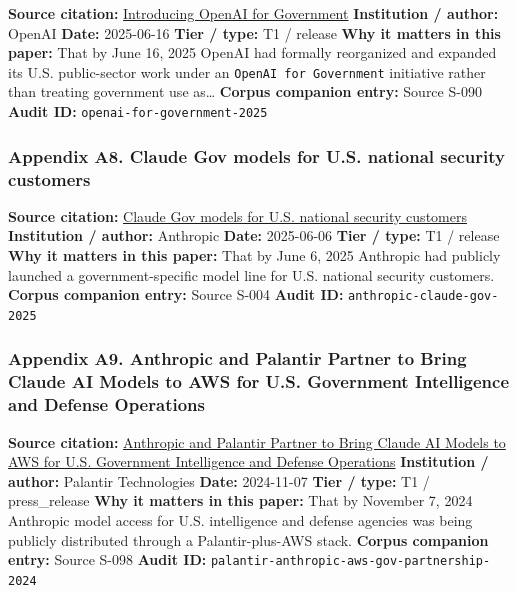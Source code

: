 \documentclass[
  american,
  11pt,
  letterpaper,
]{article}
\begin{document}
\textbf{Source citation:}
\href{https://openai.com/global-affairs/introducing-openai-for-government/}{Introducing
OpenAI for Government} \textbf{Institution / author:} OpenAI
\textbf{Date:} 2025-06-16 \textbf{Tier / type:} T1 / release \textbf{Why
it matters in this paper:} That by June 16, 2025 OpenAI had formally
reorganized and expanded its U.S. public-sector work under an
\texttt{OpenAI\ for\ Government} initiative rather than treating
government use as\ldots{} \textbf{Corpus companion entry:} Source S-090
\textbf{Audit ID:} \texttt{openai-for-government-2025}

\subsubsection{Appendix A8. Claude Gov models for U.S. national security
customers}\label{ch-08-appendix-a8-claude-gov-models-for-u-s-national-security-customers}

\textbf{Source citation:}
\href{https://www.anthropic.com/news/claude-gov-models-for-u-s-national-security-customers}{Claude
Gov models for U.S. national security customers} \textbf{Institution /
author:} Anthropic \textbf{Date:} 2025-06-06 \textbf{Tier / type:} T1 /
release \textbf{Why it matters in this paper:} That by June 6, 2025
Anthropic had publicly launched a government-specific model line for
U.S. national security customers. \textbf{Corpus companion entry:}
Source S-004 \textbf{Audit ID:} \texttt{anthropic-claude-gov-2025}

\subsubsection{Appendix A9. Anthropic and Palantir Partner to Bring
Claude AI Models to AWS for U.S. Government Intelligence and Defense
Operations}\label{ch-08-appendix-a9-anthropic-and-palantir-partner-to-bring-claude-ai-models-to-aws-for-u-s-government-intelligence-and-defense-operations}

\textbf{Source citation:}
\href{https://investors.palantir.com/news-details/2024/Anthropic-and-Palantir-Partner-to-Bring-Claude-AI-Models-to-AWS-for-U.S.-Government-Intelligence-and-Defense-Operations/}{Anthropic
and Palantir Partner to Bring Claude AI Models to AWS for U.S.
Government Intelligence and Defense Operations} \textbf{Institution /
author:} Palantir Technologies \textbf{Date:} 2024-11-07 \textbf{Tier /
type:} T1 / press\_release \textbf{Why it matters in this paper:} That
by November 7, 2024 Anthropic model access for U.S. intelligence and
defense agencies was being publicly distributed through a
Palantir-plus-AWS stack. \textbf{Corpus companion entry:} Source S-098
\textbf{Audit ID:} \texttt{palantir-anthropic-aws-gov-partnership-2024}
\end{document}
